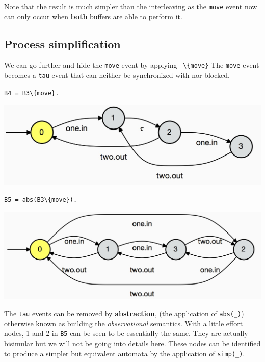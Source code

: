 \documentclass[]{article}
\begin{document}
Note that the result is much simpler than the interleaving as the \verb$move$ event now can only occur when {\bf both} buffers are able to perform it.



\subsection{Process simplification}
We can go further and hide the \verb$move$ event  by applying \verb$_\{move}$ The \verb$move$ event  becomes a \verb$tau$ event that can neither  be synchronized with nor blocked.

\begin{minipage}{0.45\textwidth}
\noindent\begin{center}\verb$B4 = B3\{move}.$

 \includegraphics[scale=0.15]{B4.jpg} \end{center} 
 \end{minipage}
\begin{minipage}{0.45\textwidth}
\noindent\begin{center}\verb$B5 = abs(B3\{move}).$

 \includegraphics[scale=0.15]{B5.jpg} \end{center} 
 \end{minipage}

The \verb$tau$ events  can be removed by {\bf abstraction}, (the application of \verb$abs(_)$) otherwise known as building the \emph{observational} semantics.  With a little effort nodes, 1 and 2 in \verb$B5$ can be seen to be  essentially the same.  They are actually bisimular but we will not be going into details here. These nodes can be identified to produce a simpler but equivalent automata by the application of \verb$simp(_)$.
\end{document}
